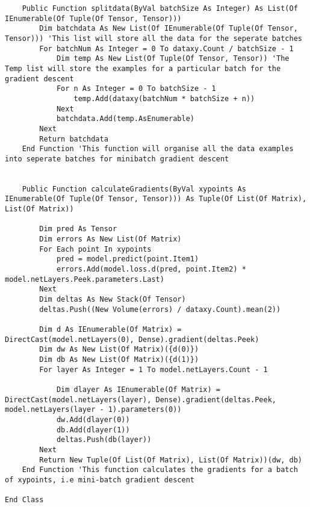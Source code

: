 \begin{verbatim}
    Public Function splitdata(ByVal batchSize As Integer) As List(Of IEnumerable(Of Tuple(Of Tensor, Tensor)))
        Dim batchdata As New List(Of IEnumerable(Of Tuple(Of Tensor, Tensor))) 'This list will store all the data for the seperate batches
        For batchNum As Integer = 0 To dataxy.Count / batchSize - 1
            Dim temp As New List(Of Tuple(Of Tensor, Tensor)) 'The Temp list will store the examples for a particular batch for the gradient descent
            For n As Integer = 0 To batchSize - 1
                temp.Add(dataxy(batchNum * batchSize + n))
            Next
            batchdata.Add(temp.AsEnumerable)
        Next
        Return batchdata
    End Function 'This function will organise all the data examples into seperate batches for minibatch gradient descent


    Public Function calculateGradients(ByVal xypoints As IEnumerable(Of Tuple(Of Tensor, Tensor))) As Tuple(Of List(Of Matrix), List(Of Matrix))

        Dim pred As Tensor
        Dim errors As New List(Of Matrix)
        For Each point In xypoints
            pred = model.predict(point.Item1)
            errors.Add(model.loss.d(pred, point.Item2) * model.netLayers.Peek.parameters.Last)
        Next
        Dim deltas As New Stack(Of Tensor)
        deltas.Push((New Volume(errors) / dataxy.Count).mean(2))

        Dim d As IEnumerable(Of Matrix) = DirectCast(model.netLayers(0), Dense).gradient(deltas.Peek)
        Dim dw As New List(Of Matrix)({d(0)})
        Dim db As New List(Of Matrix)({d(1)})
        For layer As Integer = 1 To model.netLayers.Count - 1

            Dim dlayer As IEnumerable(Of Matrix) = DirectCast(model.netLayers(layer), Dense).gradient(deltas.Peek, model.netLayers(layer - 1).parameters(0))
            dw.Add(dlayer(0))
            db.Add(dlayer(1))
            deltas.Push(db(layer))
        Next
        Return New Tuple(Of List(Of Matrix), List(Of Matrix))(dw, db)
    End Function 'This function calculates the gradients for a batch of xypoints, i.e mini-batch gradient descent

End Class

\end{verbatim}